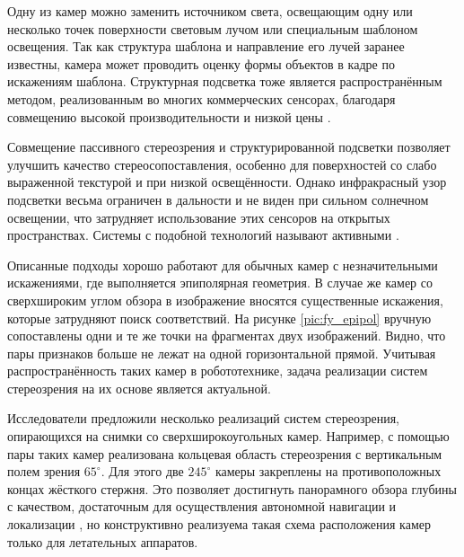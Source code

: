 Одну из камер можно заменить источником  света, освещающим одну или несколько точек поверхности световым лучом или специальным шаблоном освещения.  %
Так как структура шаблона и направление его  лучей заранее известны, камера может проводить оценку формы объектов в кадре по искажениям шаблона\cite{shapiro}. 
Структурная подсветка тоже является распространённым методом, реализованным во многих коммерческих сенсорах,  благодаря совмещению высокой производительности 
и  низкой цены \cite{struct_light}.  

Совмещение пассивного стереозрения и структурированной подсветки позволяет улучшить качество стереосопоставления, особенно для поверхностей со слабо выраженной текстурой
и при низкой освещённости. Однако инфракрасный узор подсветки весьма ограничен в дальности и не виден при сильном солнечном освещении, что затрудняет использование этих    %
сенсоров на открытых пространствах. Системы с подобной технологий называют активными \cite{kinect_perf}. 

Описанные подходы хорошо работают для обычных камер с незначительными искажениями, где выполняется эпиполярная геометрия. 
В случае  же камер со сверхшироким углом обзора в изображение вносятся существенные искажения, которые затрудняют поиск соответствий. На 
рисунке \ref{pic:fy_epipol} вручную сопоставлены одни и те же точки на фрагментах двух изображений. Видно, что пары признаков больше не лежат
на одной горизонтальной прямой.  Учитывая распространённость таких  камер в робототехнике, задача реализации систем стереозрения на их основе 
является актуальной.    %


Исследователи предложили несколько реализаций систем стереозрения, опирающихся на снимки со сверхширокоугольных камер. 
Например, с помощью  пары таких камер реализована  кольцевая область стереозрения с вертикальным  %
полем зрения $65^\circ$\cite{omni_stereo}. Для этого две $245^\circ$ камеры закреплены на противоположных концах жёсткого стержня.  
Это позволяет достигнуть панорамного обзора глубины с качеством, достаточным для осуществления автономной навигации и
локализации \cite{omni_copter}, но конструктивно реализуема такая схема расположения камер только для летательных аппаратов.  

